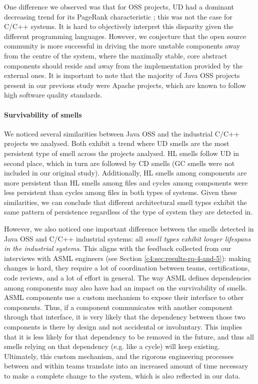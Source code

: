 One difference we observed was that for OSS projects, UD had a dominant decreasing trend for its PageRank characteristic \cite{Sas2019}; this was not the case for C/C++ systems.
It is hard to objectively interpret this disparity given the different programming languages. However, we conjecture that the open source community is more successful in driving the more unstable components away from the centre of the system, where the maximally stable, core abstract components should reside \cite{Martin2018} and away from the implementation provided by the external ones.
It is important to note that the majority of Java OSS projects present in our previous study \cite{Sas2019} were Apache projects, which are known to follow high software quality standards.

\paragraph{Survivability of smells}
We noticed several similarities between Java OSS and the industrial C/C++ projects we analysed.
Both exhibit a trend where UD smells are the most persistent type of smell across the projects analysed.
HL smells follow UD in second place, which in turn are followed by CD smells (GC smells were not included in our original study).
Additionally, HL smells among components are more persistent than HL smells among files and cycles among components were less persistent than cycles among files in both types of systems.
Given these similarities, we can conclude that different architectural smell types exhibit the same pattern of persistence regardless of the type of system they are detected in.

However, we also noticed one important difference between the smells detected in Java OSS and C/C++ industrial systems: all \emph{smell types exhibit longer lifespans in the industrial systems}. 
This aligns with the feedback collected from our interviews with ASML engineers (see Section \ref{c4:sec:results-rq-4-and-5}): making changes is hard, they require a lot of coordination between teams, certifications, code reviews, and a lot of effort in general.
The way ASML defines dependencies among components may also have had an impact on the survivability of smells. ASML components use a custom mechanism to expose their interface to other components. Thus, if a component communicates with another component through that interface, it is very likely that the dependency between those two components is there by design and not accidental or involuntary. This implies that it is less likely for that dependency to be removed in the future, and thus all smells relying on that dependency (e.g. like a cycle) will keep existing.
Ultimately, this custom mechanism, and the rigorous engineering processes between and within teams translate into an increased amount of time necessary to make a complete change to the system, which is also reflected in our data.

